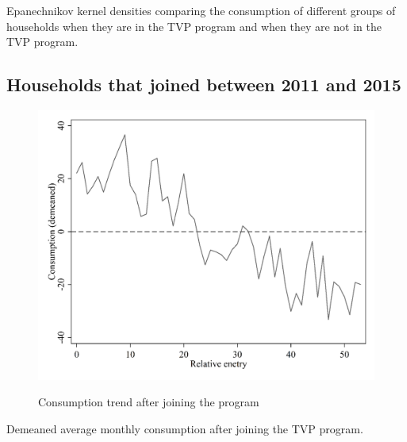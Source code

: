 Epanechnikov kernel densities comparing the consumption of different groups of households when they are in the TVP program and when they are not in the TVP program.

\FloatBarrier

\clearpage

\subsection{Households that joined between 2011 and 2015}\label{appendix:B}

\begin{figure}[ht]
  \caption{Consumption trend after joining the program}\label{fig:eight}
  \begin{center}
  {\includegraphics[width=1\textwidth]{./figures/image8.png}}
  \end{center}
\end{figure}

Demeaned average monthly consumption after joining the TVP program.\par

\FloatBarrier

